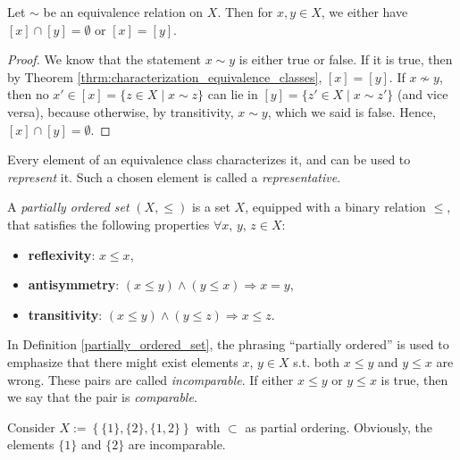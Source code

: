 \begin{theorem}
	Let $\sim$ be an equivalence relation on $X$. Then for $x, y\in X$, we either have $[x] \cap [y] = \emptyset$ or $[x] = [y]$.
\end{theorem}

\begin{proof}
	We know that the statement $x\sim y$ is either true or false. If it is true, then by Theorem \ref{thrm:characterization_equivalence_classes}, $[x] = [y]$. If $x\not\sim y$, then no $x'\in [x] = \{z\in X\mid x\sim z\}$ can lie in $[y] = \{z'\in X\mid x\sim z'\}$ (and vice versa), because otherwise, by transitivity, $x\sim y$, which we said is false. Hence, $[x] \cap [y] = \emptyset$.
\end{proof}

\begin{defn}
	Every element of an equivalence class characterizes it, and can be used to \textit{represent} it. Such a chosen element is called a \textit{representative}.
\end{defn}

\begin{defn}\label{partially_ordered_set}
	A \textit{partially ordered set}  $\left(X, \leq\right)$ is a set $X$, equipped with a binary relation $\leq$, that satisfies the following properties $\forall x$, $y$, $z\in X$:
	\begin{itemize}
		\item \textbf{reflexivity}: $x\leq x$, 
		\item \textbf{antisymmetry}: $\left(x\leq y\right) \wedge \left(y\leq x\right) \Rightarrow x = y$, 
		\item \textbf{transitivity}: $\left(x\leq y\right) \wedge \left(y\leq z\right)\Rightarrow x\leq z$. 
	\end{itemize}
\end{defn}

\begin{defn}[Incomparability]
	In Definition \ref{partially_ordered_set}, the phrasing \enquote{partially ordered} is used to emphasize that there might exist elements $x$, $y\in X$ s.t. both $x\leq y$ and $y\leq x$ are wrong. These pairs are called \textit{incomparable}. If either $x\leq y$ or $y \leq x$ is true, then we say that the pair is \textit{comparable}. 
\end{defn}

\begin{exmp}
	Consider $X := \left\{\{1\}, \{2\}, \{1, 2\}\right\}$ with $\subset$ as partial ordering. Obviously, the elements $\{1\}$ and $\{2\}$ are incomparable. 
\end{exmp}

